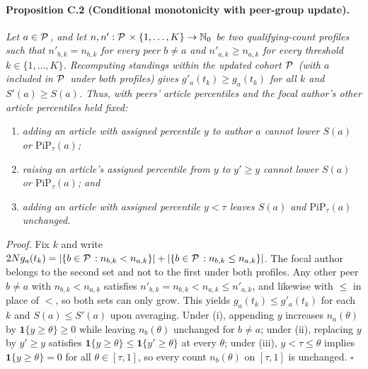 \documentclass[11pt]{article}
\newcommand{\PiP}{\mathrm{PiP}}
\begin{document}
\paragraph{Proposition C.2 (Conditional monotonicity with peer-group update).}
\emph{Let $a \in {\mathcal{P}\mkern2.5mu}$, and let $n, n' : {\mathcal{P}\mkern2.5mu} \times \{1, \dots, K\} \to \mathbb{N}_0$ be two qualifying-count
profiles such that $n'_{b,k} = n_{b,k}$ for every peer $b \ne a$ and $n'_{a,k} \ge n_{a,k}$ for every threshold $k \in
\{1, \dots, K\}$. Recomputing standings within the updated cohort ${\mathcal{P}\mkern2.5mu}$ (with $a$ included in ${\mathcal{P}\mkern2.5mu}$ under both
profiles) gives $g'_a(t_k) \ge g_a(t_k)$ for all $k$ and $S'(a) \ge S(a)$. Thus, with peers' article percentiles
and the focal author's other article percentiles held fixed:}
\begin{enumerate}
  \item[(i)] \emph{adding an article with assigned percentile $y$ to author $a$ cannot lower $S(a)$ or $\PiP_\tau(a)$;}
  \item[(ii)] \emph{raising an article's assigned percentile from $y$ to $y' \ge y$ cannot lower $S(a)$ or
  $\PiP_\tau(a)$; and}
  \item[(iii)] \emph{adding an article with assigned percentile $y < \tau$ leaves $S(a)$ and $\PiP_\tau(a)$ unchanged.}
\end{enumerate}

\noindent\emph{Proof.}
Fix $k$ and write $2N g_a(t_k) = |\{b \in {\mathcal{P}\mkern2.5mu} : n_{b,k} < n_{a,k}\}| + |\{b \in {\mathcal{P}\mkern2.5mu} : n_{b,k} \le n_{a,k}\}|$. The
focal author belongs to the second set and not to the first under both profiles. Any other peer $b \ne a$ with $n_{b,k}
< n_{a,k}$ satisfies $n'_{b,k} = n_{b,k} < n_{a,k} \le n'_{a,k}$, and likewise with $\le$ in place of $<$, so both sets
can only grow. This yields $g_a(t_k) \le g'_a(t_k)$ for each $k$ and $S(a) \le S'(a)$ upon averaging. Under
(i), appending $y$ increases $n_a(\theta)$ by $\mathbf{1}\{y \ge \theta\} \ge 0$ while leaving $n_b(\theta)$ unchanged
for $b \ne a$; under (ii), replacing $y$ by $y' \ge y$ satisfies $\mathbf{1}\{y \ge \theta\} \le \mathbf{1}\{y' \ge
\theta\}$ at every $\theta$; under (iii), $y < \tau \le \theta$ implies $\mathbf{1}\{y \ge \theta\} = 0$ for all
$\theta \in [\tau, 1]$, so every count $n_b(\theta)$ on $[\tau, 1]$ is unchanged. \hfill$\square$
\end{document}
